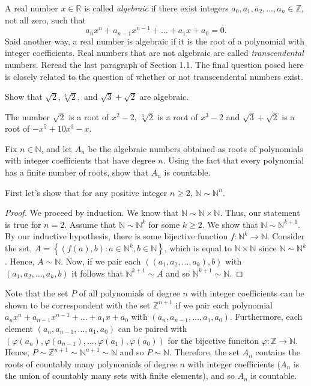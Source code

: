 \documentclass[12pt]{article}
\newcommand{\N}{\mathbb{N}}
\newcommand{\Z}{\mathbb{Z}}
\newcommand{\R}{\mathbb{R}}
\newenvironment{problem}[2][Problem]{\begin{trivlist}
		\item[\hskip \labelsep {\bfseries #1}\hskip \labelsep {\bfseries #2.}]}{\end{trivlist}}
\newenvironment{solution}[2][Solution]{\begin{trivlist}
		\item[\hskip \labelsep {\bfseries #1}\hskip \labelsep {\bfseries #2.}]}{\end{trivlist}}
\begin{document}
\begin{problem}{1.5.9}
  A real number $x\in\R$ is called \textit{algebraic} if there exist integers $a_{0},a_{1},a_{2},\dots,a_{n}\in\Z$, not all zero, such that
  \begin{equation*}
    a_{n}x^{n}+a_{n-1}x^{n-1}+\dots+a_{1}x+a_{0}=0.
  \end{equation*}
  Said another way, a real number is algebraic if it is the root of a polynomial with integer coefficients. Real numbers that are not algebraic are called \textit{transcendental} numbers. Reread the last paragraph of Section 1.1. The final question posed here is closely related to the question of whether or not transcendental numbers exist.
  \begin{enumerate}[label=(\alph*)]
    \item Show that $\sqrt{2}, \sqrt[3]{2},$ and $\sqrt{3}+\sqrt{2}$ are algebraic.
      \begin{solution}{(a)}
	The number $\sqrt{2}$ is a root of $x^{2}-2$, $\sqrt[3]{2}$ is a root of $x^{3}-2$ and $\sqrt{3}+\sqrt{2}$ is a root of $-x^{5}+10x^{3}-x$.
      \end{solution}
    \item Fix $n\in \N$, and let $A_{n}$ be the algebraic numbers obtained as roots of polynomials with integer coefficients that have degree $n$. Using the fact that every polynomial has a finite number of roots, show that $A_{n}$ is countable.
      \begin{solution}{(b)}
	First let's show that for any positive integer $n\geq 2$, $\N\sim \N^{n}$.
	\begin{proof}
	  We proceed by induction. We know that $\N\sim \N\times \N$. Thus, our  statement is true for $n=2$. Assume that $\N\sim \N^{k}$ for some $k\geq 2$. We show that $\N\sim \N^{k+1}$. By our inductive hypothesis, there is some bijective function $f:\N^{k}\to \N$. Consider the set, $A=\left\{(f(a),b):a\in\N^{k},b\in\N\right\}$, which is equal to $\N\times\N$ since $\N\sim \N^{k}$. Hence, $A\sim \N$. Now, if we pair each $\left( (a_{1},a_{2},\dots,a_{k}),b \right)$ with $\left( a_{1},a_{2},\dots,a_{k},b\right)$ it follows that $\N^{k+1}\sim A$ and so $\N^{k+1}\sim \N$.
	\end{proof}
	Note that the set $P$ of all polynomials of degree $n$ with integer coefficients can be shown to be correspondent with the set $\Z^{n+1}$ if we pair each polynomial $a_{n}x^{n}+a_{n-1}x^{n-1}+\dots+a_{1}x+a_{0}$ with $(a_{n},a_{n-1},\dots,a_{1},a_{0})$. Furthermore, each element $(a_{n},a_{n-1},\dots,a_{1},a_{0})$ can be paired with $(\varphi(a_{n}),\varphi(a_{n-1}),\dots,\varphi(a_{1}),\varphi(a_{0}))$ for the bijective funciton $\varphi:\Z\to\N$. Hence, $P\sim\Z^{n+1}\sim \N^{n+1}\sim \N$ and so $P\sim \N$. Therefore, the set $A_{n}$ contains the roots of countably many polynomials of degree $n$ with integer coefficients ($A_{n}$ is the union of countably many sets with finite elements), and so $A_{n}$ is countable. 

\end{solution}
\end{enumerate}
\end{problem}
\end{document}
